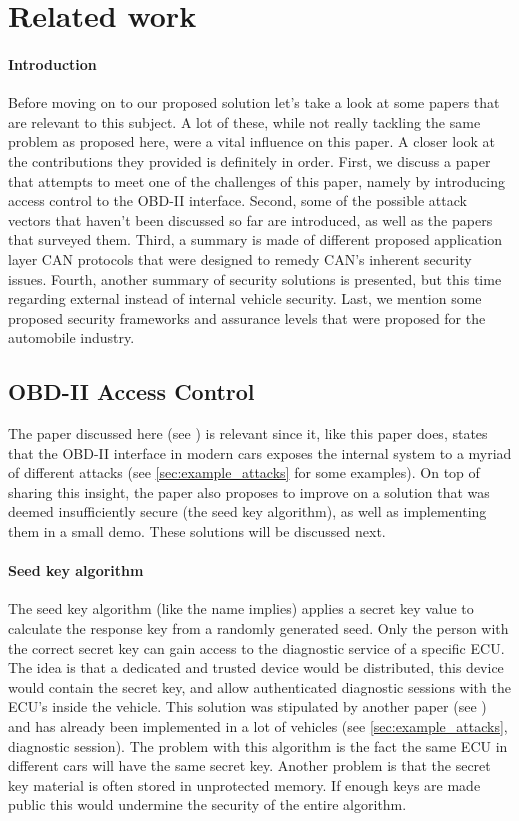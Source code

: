 \documentclass[11pt]{article}
\begin{document}
\section{Related work}
\label{sec:related_work}

\paragraph{Introduction} Before moving on to our proposed solution let's take a look at some papers that are relevant to this subject. A lot of these, while not really tackling the same problem as proposed here, were a vital influence on this paper. A closer look at the contributions they provided is definitely in order. First, we discuss a paper that attempts to meet one of the challenges of this paper, namely by introducing access control to the OBD-II interface. Second, some of the possible attack vectors that haven't been discussed so far are introduced, as well as the papers that surveyed them. Third, a summary is made of different proposed application layer CAN protocols that were designed to remedy CAN's inherent security issues. Fourth, another summary of security solutions is presented, but this time regarding external instead of internal vehicle security. Last, we mention some proposed security frameworks and assurance levels that were proposed for the automobile industry.

\subsection{OBD-II Access Control}
\label{sec:obd_access_control}

The paper discussed here (see \cite{Yadav16}) is relevant since it, like this paper does, states that the OBD-II interface in modern cars exposes the internal system to a myriad of different attacks (see \ref{sec:example_attacks} for some examples). On top of sharing this insight, the paper also proposes to improve on a solution that was deemed insufficiently secure (the seed key algorithm), as well as implementing them in a small demo. These solutions will be discussed next.


\paragraph{Seed key algorithm} The seed key algorithm (like the name implies) applies a secret key value to calculate the response key from a randomly generated seed. Only the person with the correct secret key can gain access to the diagnostic service of a specific ECU. The idea is that a dedicated and trusted device would be distributed, this device would contain the secret key, and allow authenticated diagnostic sessions with the ECU's inside the vehicle. This solution was stipulated by another paper (see \cite{Bayer}) and has already been implemented in a lot of vehicles (see \ref{sec:example_attacks}, diagnostic session). The problem with this algorithm is the fact the same ECU in different cars will have the same secret key. Another problem is that the secret key material is often stored in unprotected memory. If enough keys are made public this would undermine the security of the entire algorithm.  
\end{document}
